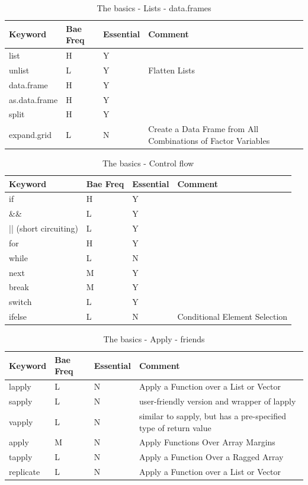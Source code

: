 \documentclass[11pt,]{krantz}
\theoremstyle{definition}
\theoremstyle{definition}
\theoremstyle{remark}
\begin{document}
\begin{table}

\caption{\label{tab:knitchunk9}The basics - Lists - data.frames }
\centering
\begin{tabular}[t]{llll}
\toprule
Keyword & Bae Freq & Essential & Comment\\
\midrule
list & H & Y & \\
unlist & L & Y & Flatten Lists\\
data.frame & H & Y & \\
as.data.frame & H & Y & \\
split & H & Y & \\
expand.grid & L & N & Create a Data Frame from All Combinations of Factor Variables\\
\bottomrule
\end{tabular}
\end{table}

\begin{table}

\caption{\label{tab:knitchunk10}The basics - Control flow }
\centering
\begin{tabular}[t]{llll}
\toprule
Keyword & Bae Freq & Essential & Comment\\
\midrule
if & H & Y & \\
\&\& & L & Y & \\
|| (short circuiting) & L & Y & \\
for & H & Y & \\
while & L & N & \\
\addlinespace
next & M & Y & \\
break & M & Y & \\
switch & L & Y & \\
ifelse & L & N & Conditional Element Selection\\
\bottomrule
\end{tabular}
\end{table}

\begin{table}

\caption{\label{tab:knitchunk11}The basics - Apply - friends}
\centering
\begin{tabular}[t]{llll}
\toprule
Keyword & Bae Freq & Essential & Comment\\
\midrule
lapply & L & N & Apply a Function over a List or Vector\\
sapply & L & N & user-friendly version and wrapper of lapply\\
vapply & L & N & similar to sapply, but has a pre-specified type of return value\\
apply & M & N & Apply Functions Over Array Margins\\
tapply & L & N & Apply a Function Over a Ragged Array\\
replicate & L & N & Apply a Function over a List or Vector\\
\bottomrule
\end{tabular}
\end{table}
\end{document}
